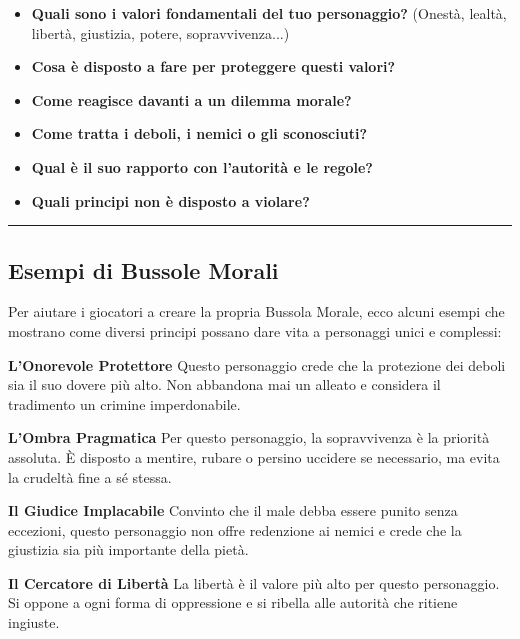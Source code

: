 \documentclass[../manuale_main.tex]{subfiles}
\begin{document}
\begin{itemize}
    \item \textbf{Quali sono i valori fondamentali del tuo personaggio?} (Onestà, lealtà, libertà, giustizia, potere, sopravvivenza...)
    \item \textbf{Cosa è disposto a fare per proteggere questi valori?}
    \item \textbf{Come reagisce davanti a un dilemma morale?}
    \item \textbf{Come tratta i deboli, i nemici o gli sconosciuti?}
    \item \textbf{Qual è il suo rapporto con l’autorità e le regole?}
    \item \textbf{Quali principi non è disposto a violare?}
\end{itemize}

\vspace{0.5cm}
\rule{\textwidth}{0.4pt}
\vspace{0.5cm}

\subsection{Esempi di Bussole Morali}
Per aiutare i giocatori a creare la propria Bussola Morale, ecco alcuni esempi che mostrano come diversi principi possano dare vita a personaggi unici e complessi:

\vspace{0.3cm}

\textbf{L'Onorevole Protettore}  
Questo personaggio crede che la protezione dei deboli sia il suo dovere più alto. Non abbandona mai un alleato e considera il tradimento un crimine imperdonabile.  

\vspace{0.2cm}

\textbf{L'Ombra Pragmatica}  
Per questo personaggio, la sopravvivenza è la priorità assoluta. È disposto a mentire, rubare o persino uccidere se necessario, ma evita la crudeltà fine a sé stessa.  

\vspace{0.2cm}

\textbf{Il Giudice Implacabile}  
Convinto che il male debba essere punito senza eccezioni, questo personaggio non offre redenzione ai nemici e crede che la giustizia sia più importante della pietà.  

\vspace{0.2cm}

\textbf{Il Cercatore di Libertà}  
La libertà è il valore più alto per questo personaggio. Si oppone a ogni forma di oppressione e si ribella alle autorità che ritiene ingiuste.  
\end{document}
